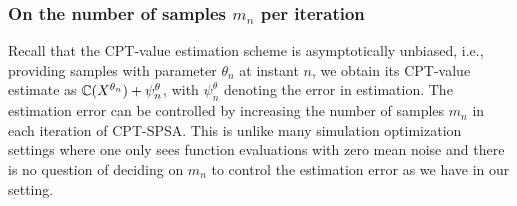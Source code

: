 
\subsubsection*{On the number of samples $m_n$ per iteration}
Recall that the CPT-value estimation scheme is asymptotically unbiased, i.e., providing samples with parameter $\theta_n$ at instant $n$, we obtain its CPT-value estimate as $\mathbb{C}(X^{\theta_n}) + \psi_n^\theta$, with $\psi_n^\theta$ denoting the error in estimation. The estimation error can be controlled by increasing the number of samples $m_n$ in each iteration of CPT-SPSA. This is unlike many simulation optimization settings where one only sees function evaluations with zero mean noise and there is no question of deciding on $m_n$ to control the estimation error as we have in our setting.

